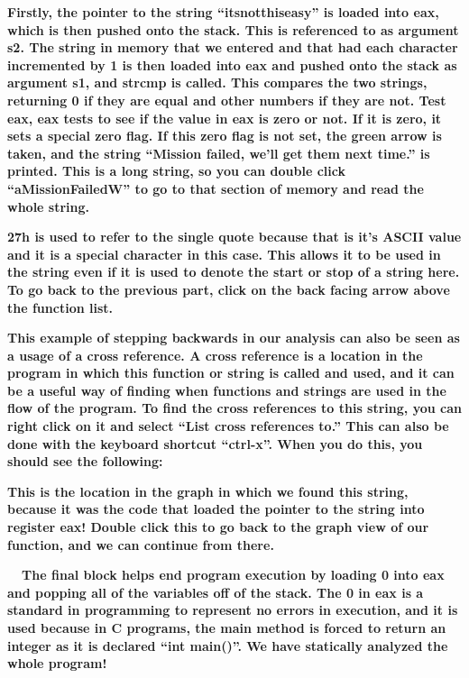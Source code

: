 \documentclass[letterpaper]{article}
\newcommand{\sitfig}[3]{
\begin{figure}[H]
\centering
\makebox[\textwidth][c]{
#2
}
\label{#1}
\end{figure}
}
\newcommand{\sitgfx}[4][scale=1.0]{
\sitfig{#3}{\texttt{[image: \#2]}}{#4}
}
\begin{document}
  
\sitgfx[width=6.4898in,height=3.948in]{FINALWORKINGDOCFORMERLYPRECURSOR-img049.png}{fig:unk}{TODO CAPTION}
 \textbf{Firstly, the pointer to the string ``itsnotthiseasy'' is loaded into eax, which is then pushed onto the stack.
This is referenced to as argument s2. The string in memory that we entered and that had each character incremented by 1
is then loaded into eax and pushed onto the stack as argument s1, and strcmp is called. This compares the two strings,
returning 0 if they are equal and other numbers if they are not. Test eax, eax tests to see if the value in eax is zero
or not. If it is zero, it sets a special zero flag. If this zero flag is not set, the green arrow is taken, and the
string ``Mission failed, we'll get them next time.'' is printed. This is a long string, so you can double click
``aMissionFailedW'' to go to that section of memory and read the whole string.}  
\sitgfx[width=6.5in,height=0.6563in]{FINALWORKINGDOCFORMERLYPRECURSOR-img050.png}{fig:unk}{TODO CAPTION}
 \textbf{27h is used to refer to the single quote because that is it's ASCII value and it is a special character in this
case. This allows it to be used in the string even if it is used to denote the start or stop of a string here. To go
back to the previous part, click on the back facing arrow above the function list.}

  
\sitgfx[width=4.1252in,height=2.1772in]{FINALWORKINGDOCFORMERLYPRECURSOR-img051.png}{fig:unk}{TODO CAPTION}
 \textbf{\newline
This example of stepping backwards in our analysis can also be seen as a usage of a cross reference. A cross reference
is a location in the program in which this function or string is called and used, and it can be a useful way of finding
when functions and strings are used in the flow of the program. To find the cross references to this string, you can
right click on it and select ``List cross references to.'' This can also be done with the keyboard shortcut ``ctrl-x''.
When you do this, you should see the following:}

  
\sitgfx[width=6.4898in,height=1.6043in]{FINALWORKINGDOCFORMERLYPRECURSOR-img052.png}{fig:unk}{TODO CAPTION}
 

\textbf{This is the location in the graph in which we found this string, because it was the code that loaded the pointer
to the string into register eax! Double click this to go back to the graph view of our function, and we can continue
from there.}

\textbf{ \ \ The final block helps end program execution by loading 0 into eax and popping all of the variables off of
the stack. The 0 in eax is a standard in programming to represent no errors in execution, and it is used because in C
programs, the main method is forced to return an integer as it is declared ``int main()''. We have statically analyzed
the whole program!}
\end{document}
